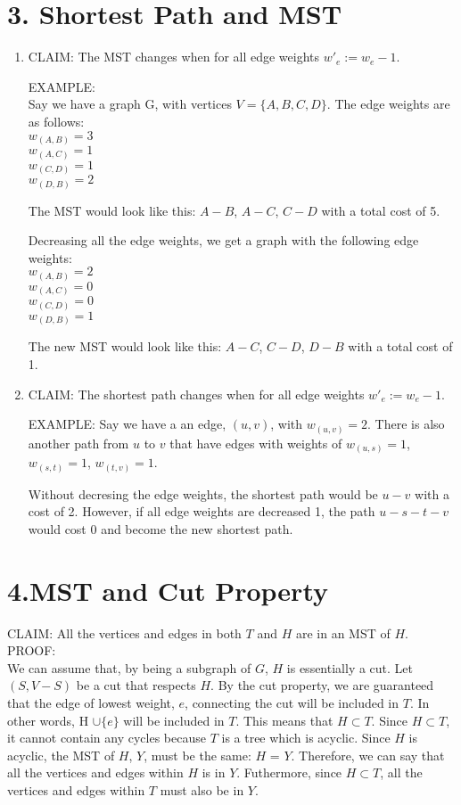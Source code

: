 \documentclass[11pt]{article}
\newenvironment{qparts}{\begin{enumerate}[{(}a{)}]}{\end{enumerate}}
\begin{document}
\section*{3. Shortest Path and MST}
\begin{qparts}

\item 

CLAIM: The MST changes when for all edge weights $w'_{e} := w_e - 1$.

EXAMPLE: \\
Say we have a graph G, with vertices $V = \{A, B, C, D\}$. The edge weights are as follows: \\
$w_{(A, B)} = 3$ \\
$w_{(A, C)} = 1$ \\
$w_{(C, D)} = 1$ \\
$w_{(D, B)} = 2$ 

The MST would look like this: $A-B$, $A-C$, $C-D$ with a total cost of 5. 

Decreasing all the edge weights, we get a graph with the following edge weights:\\
$w_{(A, B)} = 2$ \\
$w_{(A, C)} = 0$ \\
$w_{(C, D)} = 0$ \\
$w_{(D, B)} = 1$ 

The new MST would look like this: $A-C$, $C-D$, $D-B$ with a total cost of 1. 


\item 
CLAIM: The shortest path changes when for all edge weights $w'_{e} := w_e - 1$.

EXAMPLE: Say we have a an edge, $(u, v)$, with $w_{(u, v)} = 2$. There is also another path from $u$ to $v$ that have edges with weights of $w_{(u, s)} = 1$, $w_{(s, t)} = 1$, $w_{(t, v)} = 1$. 

Without decresing the edge weights, the shortest path would be $u-v$ with a cost of 2. However, if all edge weights are decreased 1, the path $u-s-t-v$ would cost 0 and become the new shortest path. 

\end{qparts}

\newpage
\section*{4.MST and Cut Property}

CLAIM: All the vertices and edges in both $T$ and $H$ are in an MST of $H$.
\\
PROOF:\\
We can assume that, by being a subgraph of $G$, $H$ is essentially a cut. Let $(S, V-S)$ be a cut that respects $H$. By the cut property, we are guaranteed that the edge of lowest weight, $e$, connecting the cut will be included in $T$. In other words, H $\cup \{e\}$ will be included in $T$. This means that $H \subset T$. Since $H \subset T$, it cannot contain any cycles because $T$ is a tree which is acyclic. Since $H$ is acyclic, the MST of $H$, $Y$, must be the same: $H$ = $Y$. Therefore, we can say that all the vertices and edges within $H$ is in $Y$. Futhermore, since $H \subset T$, all the vertices and edges within $T$ must also be in $Y$.

\newpage
\end{document}
